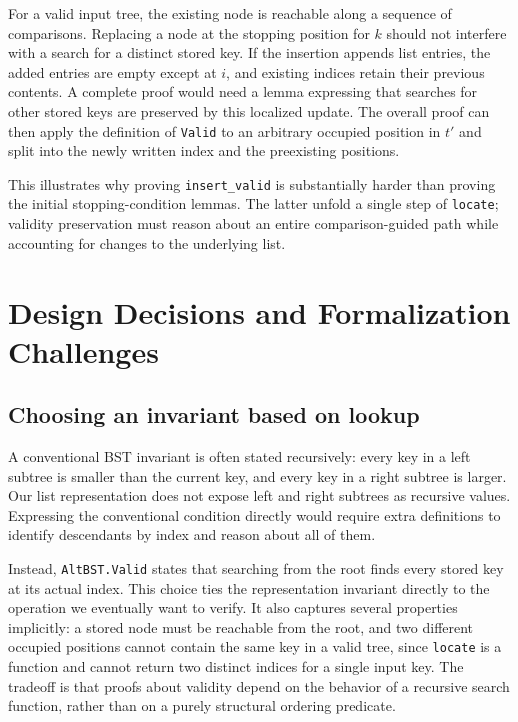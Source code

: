 \documentclass[10pt]{article}
\begin{document}
For a valid input tree, the existing node is reachable along a sequence of comparisons. Replacing a node at the stopping position for $k$ should not interfere with a search for a distinct stored key. If the insertion appends list entries, the added entries are empty except at $i$, and existing indices retain their previous contents. A complete proof would need a lemma expressing that searches for other stored keys are preserved by this localized update. The overall proof can then apply the definition of \texttt{Valid} to an arbitrary occupied position in $t'$ and split into the newly written index and the preexisting positions.

This illustrates why proving \texttt{insert\_valid} is substantially harder than proving the initial stopping-condition lemmas. The latter unfold a single step of \texttt{locate}; validity preservation must reason about an entire comparison-guided path while accounting for changes to the underlying list.

\section{Design Decisions and Formalization Challenges}

\subsection{Choosing an invariant based on lookup}

A conventional BST invariant is often stated recursively: every key in a left subtree is smaller than the current key, and every key in a right subtree is larger. Our list representation does not expose left and right subtrees as recursive values. Expressing the conventional condition directly would require extra definitions to identify descendants by index and reason about all of them.

Instead, \texttt{AltBST.Valid} states that searching from the root finds every stored key at its actual index. This choice ties the representation invariant directly to the operation we eventually want to verify. It also captures several properties implicitly: a stored node must be reachable from the root, and two different occupied positions cannot contain the same key in a valid tree, since \texttt{locate} is a function and cannot return two distinct indices for a single input key. The tradeoff is that proofs about validity depend on the behavior of a recursive search function, rather than on a purely structural ordering predicate.
\end{document}
